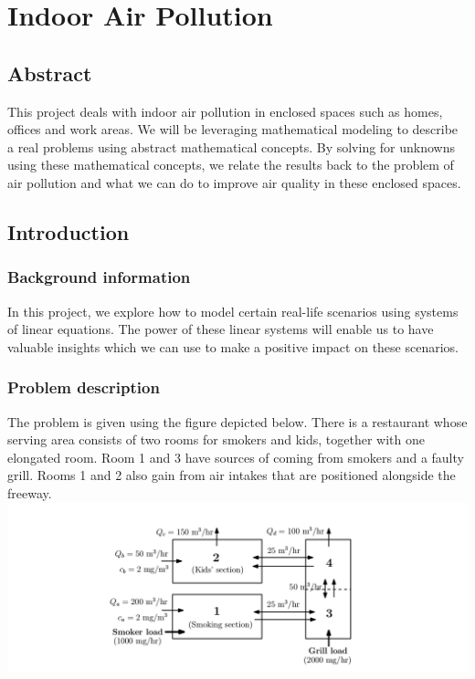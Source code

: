 \documentclass[openany]{book}
\begin{document}
    \chapter{Indoor Air Pollution}
	\section{Abstract}
	This project deals with indoor air pollution in enclosed spaces such as homes, offices and work areas. We will be leveraging mathematical modeling to describe a real problems using abstract mathematical concepts. By solving for unknowns using these mathematical concepts, we relate the results back to the problem of air pollution and what we can do to improve air quality in these enclosed spaces.
	
	\section{Introduction}
	
	\subsection{Background information}
	In this project, we explore how to model certain real-life scenarios using systems of linear equations. The power of these linear systems will enable us to have valuable insights which we can use to make a positive impact on these scenarios.
	
	\subsection{Problem description}
	The problem is given using the figure depicted below. There is a restaurant whose serving area consists of two rooms for smokers and kids, together with one elongated room. Room 1 and 3 have sources of  coming from smokers and a faulty grill. Rooms 1 and 2 also gain  from air intakes that are positioned alongside the freeway.\\
	\includegraphics[scale=0.22]{Problem.png}
    
\end{document}
